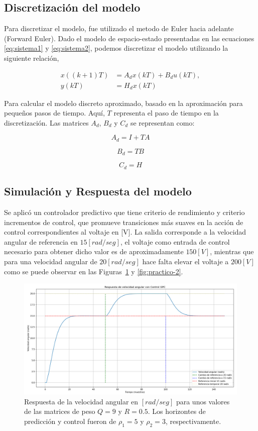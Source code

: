 \documentclass[journal]{IEEEtran}
\begin{document}
\subsection{Discretización del modelo}
Para discretizar el modelo, fue utilizado el metodo de Euler hacia adelante (Forward Euler). Dado el modelo de espacio-estado presentadas en las ecuaciones \ref{eq:sistema1} y \ref{eq:sistema2}, podemos discretizar el modelo utilizando la siguiente relación,

\begin{align}
x((k + 1)T) &= A_{d} x(kT) + B_{d} u(kT), \label{eq:sistema1} \\
y(kT) &= H_{d} x(kT) \label{eq:sistema2}
\end{align}

Para calcular el modelo discreto aproximado, basado en la aproximación para pequeños pasos de tiempo. Aquí, \( T \) representa el paso de tiempo en la discretización. Las matrices  $A_d$, $B_d$ y $C_d$ se representan como:

\[
A_d = I + TA
\]

\[
B_d = TB
\]

\[
C_d = H
\]

\subsection{Simulación y Respuesta del modelo}

Se aplicó un controlador predictivo que tiene criterio de rendimiento y criterio incrementos de control, que promueve transiciones más suaves en la acción de control correspondientes al voltaje en [V]. La salida corresponde a la velocidad angular de referencia en $15 [rad/seg]$, el voltaje como entrada de control necesario para obtener dicho valor es de  aproximadamente $150 [V]$, mientras que para una velocidad angular de $20 [rad/seg]$ hace falta elevar el voltaje a $200 [V]$ como se puede observar en las Figuras~\ref{fig:practico-1} y \ref{fig:practico-2}.


\begin{figure}[H]
    \centering
    \includegraphics[width=1\linewidth]{imagen_1.png}
    \caption{Respuesta de la velocidad angular en $[rad/seg]$ para unos valores de las matrices de peso $Q = 9$ y $R= 0.5$. Los horizontes de predicción y control fueron de $\rho_1 = 5$  y $\rho_2 = 3$, respectivamente. }
    \label{fig:practico-1}
\end{figure}
\end{document}
